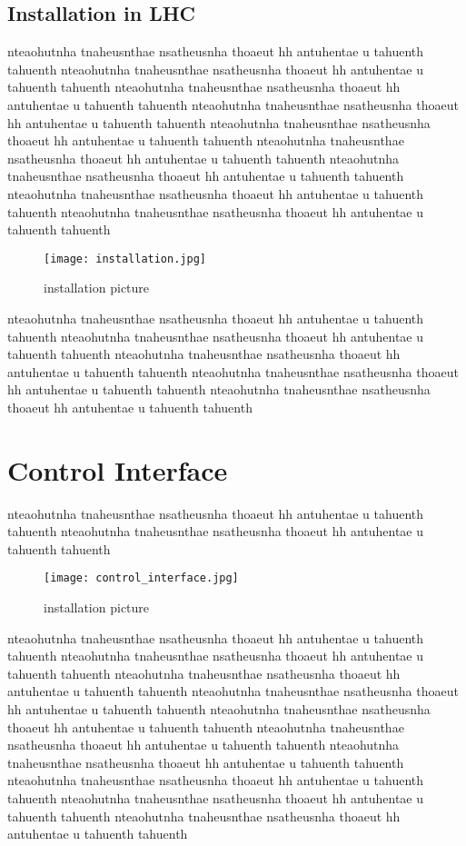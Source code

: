 \subsection{Installation in LHC}
nteaohutnha tnaheusnthae nsatheusnha thoaeut hh antuhentae u tahuenth tahuenth
nteaohutnha tnaheusnthae nsatheusnha thoaeut hh antuhentae u tahuenth tahuenth
nteaohutnha tnaheusnthae nsatheusnha thoaeut hh antuhentae u tahuenth tahuenth
nteaohutnha tnaheusnthae nsatheusnha thoaeut hh antuhentae u tahuenth tahuenth
nteaohutnha tnaheusnthae nsatheusnha thoaeut hh antuhentae u tahuenth tahuenth
nteaohutnha tnaheusnthae nsatheusnha thoaeut hh antuhentae u tahuenth tahuenth
nteaohutnha tnaheusnthae nsatheusnha thoaeut hh antuhentae u tahuenth tahuenth
nteaohutnha tnaheusnthae nsatheusnha thoaeut hh antuhentae u tahuenth tahuenth
nteaohutnha tnaheusnthae nsatheusnha thoaeut hh antuhentae u tahuenth tahuenth
\begin{figure}[!tbh]
    \centering
    \texttt{[image: installation.jpg]}
    \caption{installation picture}
    \label{fig:installation}
\end{figure}
nteaohutnha tnaheusnthae nsatheusnha thoaeut hh antuhentae u tahuenth tahuenth
nteaohutnha tnaheusnthae nsatheusnha thoaeut hh antuhentae u tahuenth tahuenth
nteaohutnha tnaheusnthae nsatheusnha thoaeut hh antuhentae u tahuenth tahuenth
nteaohutnha tnaheusnthae nsatheusnha thoaeut hh antuhentae u tahuenth tahuenth
nteaohutnha tnaheusnthae nsatheusnha thoaeut hh antuhentae u tahuenth tahuenth

\section{Control Interface}
nteaohutnha tnaheusnthae nsatheusnha thoaeut hh antuhentae u tahuenth tahuenth
nteaohutnha tnaheusnthae nsatheusnha thoaeut hh antuhentae u tahuenth tahuenth
\begin{figure}[!tbh]
    \centering
    \texttt{[image: control\_interface.jpg]}
    \caption{installation picture}
    \label{fig:control_interface}
\end{figure}
nteaohutnha tnaheusnthae nsatheusnha thoaeut hh antuhentae u tahuenth tahuenth
nteaohutnha tnaheusnthae nsatheusnha thoaeut hh antuhentae u tahuenth tahuenth
nteaohutnha tnaheusnthae nsatheusnha thoaeut hh antuhentae u tahuenth tahuenth
nteaohutnha tnaheusnthae nsatheusnha thoaeut hh antuhentae u tahuenth tahuenth
nteaohutnha tnaheusnthae nsatheusnha thoaeut hh antuhentae u tahuenth tahuenth
nteaohutnha tnaheusnthae nsatheusnha thoaeut hh antuhentae u tahuenth tahuenth
nteaohutnha tnaheusnthae nsatheusnha thoaeut hh antuhentae u tahuenth tahuenth
nteaohutnha tnaheusnthae nsatheusnha thoaeut hh antuhentae u tahuenth tahuenth
nteaohutnha tnaheusnthae nsatheusnha thoaeut hh antuhentae u tahuenth tahuenth
nteaohutnha tnaheusnthae nsatheusnha thoaeut hh antuhentae u tahuenth tahuenth

